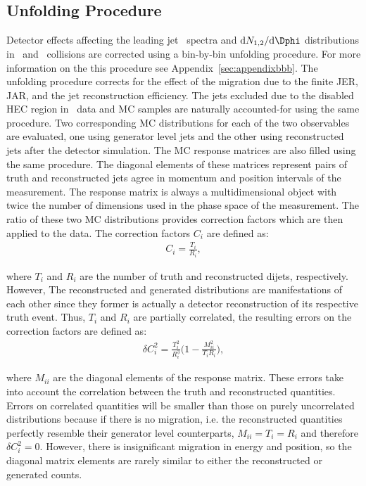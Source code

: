 \subsection{Unfolding Procedure}
\label{sec:unfolding}

Detector effects affecting the leading jet \pT\ spectra and $\mathrm{d}N_{1,2}/\mathrm{d}\Dphi$ distributions in \pp\ and \pPb\ collisions are corrected using a bin-by-bin unfolding procedure. For more information on the this procedure see Appendix~\ref{sec:appendixbbb}. The unfolding procedure corrects for the effect of the migration due to the finite JER, JAR, and the jet reconstruction efficiency. The jets excluded due to the disabled HEC region in \pPb\ data and MC samples are naturally accounted-for using the same procedure. Two corresponding MC distributions for each of the two observables are evaluated, one using generator level jets and the other using reconstructed jets after the detector simulation. The MC response matrices are also filled using the same procedure. The diagonal elements of these matrices represent pairs of truth and reconstructed jets agree in momentum and position intervals of the measurement. The response matrix is always a multidimensional object with twice the number of dimensions used in the phase space of the measurement. The ratio of these two MC distributions provides correction factors which are then applied to the data. The correction factors $C_{i}$ are defined as:  
\begin{eqnarray}
C_{i} = \frac{T_{i}}{R_{i}},
\label{eqn:factors}
\end{eqnarray}

where $T_{i}$ and $R_{i}$ are the number of truth and reconstructed dijets, respectively.  However, The reconstructed and generated distributions are manifestations of each other since they former is actually a detector reconstruction of its respective truth event. Thus, $T_{i}$ and $R_{i}$ are partially correlated, the resulting errors on the correction factors are defined as:
\begin{eqnarray}
\delta C_{i}^{2} = \frac{T_{i}^{2}}{R_{i}^{3}}\bigg(1-\frac{M_{ii}^{2}}{T_{i}R_{i}}\bigg),
\label{eqn:factorserrors}
\end{eqnarray}

where $M_{ii}$ are the diagonal elements of the response matrix. These errors take into account the correlation between the truth and reconstructed quantities. Errors on correlated quantities will be smaller than those on purely uncorrelated distributions because if there is no migration, i.e. the reconstructed quantities perfectly resemble their generator level counterparts, $M_{ii}=T_{i}=R_{i}$ and therefore $\delta C_{i}^{2} = 0$. However, there is insignificant migration in energy and position, so the diagonal matrix elements are rarely similar to either the reconstructed or generated counts.

